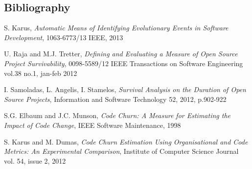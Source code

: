 \subsection{Bibliography}
\begingroup
\renewcommand{\section}[2]{}%
\begin{thebibliography}{99}
	 S. Karus, \emph{Automatic Means of
	Identifying Evolutionary Events in Software Development}, 1063-6773/13 IEEE,
	2013

	 U. Raja and M.J.
	Tretter, \emph{Defining and Evaluating a Measure of Open Source Project Survivability},
	0098-5589/12 IEEE Transactions on Software Engineering vol.38 no.1, jan-feb
	2012

	 I. Samoladas, L. Angelis, I.
	Stamelos, \emph{Survival Analysis on the Duration of Open Source Projects},
	Information and Software Technology 52, 2012, p.902-922

	 S.G. Elbaum and J.C. Munson, \emph{Code Churn: A Measure
	for Estimating the Impact of Code Change}, IEEE Software Maintenance, 1998

	 S. Karus and M. Dumas, \emph{Code Churn Estimation Using
	Organisational and Code Metrics: An Experimental Comparison}, Institute of
	Computer Science Journal vol. 54, issue 2, 2012

\end{thebibliography}
\endgroup
